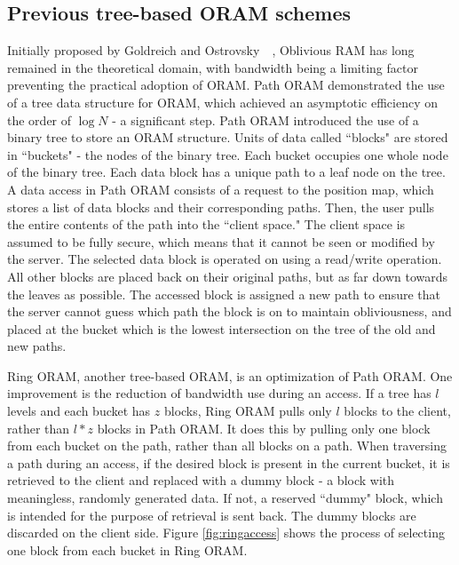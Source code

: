 \documentclass[12pt, oneside]{article}   	%
\begin{document}
\subsection{Previous tree-based ORAM schemes}
Initially proposed by Goldreich and Ostrovsky~\cite{gold}~\cite{goldostrov}, Oblivious RAM has long remained in the theoretical domain, with bandwidth being a limiting factor preventing the practical adoption of ORAM. Path ORAM demonstrated the use of a tree data structure for ORAM, which achieved an asymptotic efficiency on the order of $\log N$ - a significant step. Path ORAM introduced the use of a binary tree to store an ORAM structure. Units of data called ``blocks" are stored in ``buckets" - the nodes of the binary tree. Each bucket occupies one whole node of the binary tree. Each data block has a unique path to a leaf node on the tree. A data access in Path ORAM consists of a request to the position map, which stores a list of data blocks and their corresponding paths. Then, the user pulls the entire contents of the path into the ``client space." The client space is assumed to be fully secure, which means that it cannot be seen or modified by the server. The selected data block is operated on using a read/write operation. All other blocks are placed back on their original paths, but as far down towards the leaves as possible. The accessed block is assigned a new path to ensure that the server cannot guess which path the block is on to maintain obliviousness, and placed at the bucket which is the lowest intersection on the tree of the old and new paths. 

Ring ORAM, another tree-based ORAM, is an optimization of Path ORAM. One improvement is the reduction of bandwidth use during an access. If a tree has $l$ levels and each bucket has $z$ blocks, Ring ORAM pulls only $l$ blocks to the client, rather than $l*z$ blocks in Path ORAM. It does this by pulling only one block from each bucket on the path, rather than all blocks on a path. When traversing a path during an access, if the desired block is present in the current bucket, it is retrieved to the client and replaced with a dummy block - a block with meaningless, randomly generated data. If not, a reserved ``dummy" block, which is intended for the purpose of retrieval is sent back. The dummy blocks are discarded on the client side. Figure \ref{fig:ringaccess} shows the process of selecting one block from each bucket in Ring ORAM.
\end{document}
